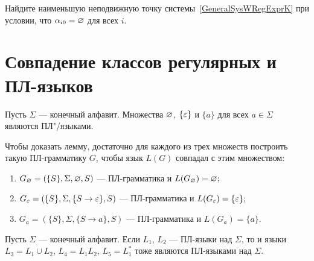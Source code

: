 \begin{myproblem}
Найдите наименьшую неподвижную точку системы~\eqref{GeneralSysWRegExprK} при условии, что $\alpha_{i0}=\varnothing$ для всех $i$.
\end{myproblem}

\section{Совпадение классов регулярных и ПЛ-языков}
\label{Chapter2MatchRegRL}

\begin{mylemma}
\label{lemma-PL-elem-lang}
Пусть $\Sigma$ --- конечный алфавит. Множества $\varnothing$, $\{\varepsilon\}$ и $\{a\}$ для всех $a\in\Sigma$ являются ПЛ"/языками.
\end{mylemma}

\begin{myproof}
Чтобы доказать лемму, достаточно для каждого из трех множеств построить такую ПЛ-грамматику $G$,  чтобы язык $L(G)$ совпадал с этим множеством:
\begin{enumerate}[itemsep=1ex]
\item $G_\varnothing=(\{S\},\Sigma,\varnothing,S)$ --- ПЛ-грамматика и $L(G_{\varnothing})=\varnothing;$
\item $G_\varepsilon=(\{S\},\Sigma,\{S\to\varepsilon\},S)$ --- ПЛ-грамматика и $L(G_\varepsilon)=\{\varepsilon\};$
\item $G_a=(\{S\}, \Sigma, \{S\to a\},S)$ --- ПЛ-грамматика и $L(G_a)=\{a\}$.
\end{enumerate}
\end{myproof}

\begin{mylemma}
\label{lemma-PL-op-lang}
Пусть $\Sigma$ --- конечный алфавит. Если $L_1$, $L_2$ --- ПЛ-языки над $\Sigma$, то и языки $L_3=L_1\cup L_2$, $L_4=L_1L_2$, $L_5=L^*_1$ тоже являются ПЛ-языками над $\Sigma$.
\end{mylemma}

